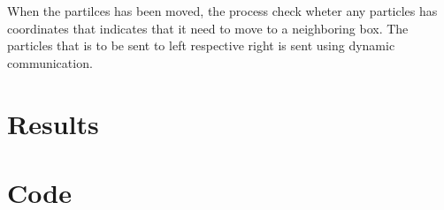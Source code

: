 \documentclass[two column]{article}
\begin{document}
When the partilces has been moved, the process check wheter any
particles has coordinates that indicates that it need to move to a
neighboring box. The particles that is to be sent to left respective
right is sent using dynamic communication. 


\section{Results}
\label{sec:results}

\clearpage
\onecolumn
\section*{Code}
\label{sec:code}


\end{document}
